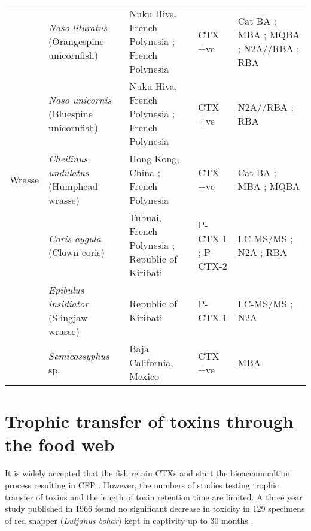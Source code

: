 \documentclass[12pt]{article}
\begin{document}
\begin{longtable}[l]{ | p{2cm} | p{3cm} | p{4.5cm} | p{2cm} | p{3cm} | }
	& \emph{Naso lituratus} (Orangespine unicornfish) & Nuku Hiva, French Polynesia \cite{darius2007ciguatera}; French Polynesia \cite{chinain2014mail,bagnis1987use} & CTX +ve \cite{darius2007ciguatera,bagnis1987use,chinain2014mail} & Cat BA \cite{bagnis1987use}; MBA \cite{bagnis1987use}; MQBA \cite{bagnis1987use}; N2A//RBA \cite{chinain2014mail}; RBA \cite{darius2007ciguatera}\\
	& \emph{Naso unicornis} (Bluespine unicornfish) & Nuku Hiva, French Polynesia \cite{darius2007ciguatera}; French Polynesia \cite{chinain2014mail} & CTX +ve \cite{darius2007ciguatera,chinain2014mail} & N2A//RBA \cite{chinain2014mail}; RBA \cite{darius2007ciguatera} \\
	\hline
	Wrasse & \emph{Cheilinus undulatus} (Humphead wrasse) & Hong Kong, China \cite{wong2005study,wong2009solid}; French Polynesia \cite{bagnis1987use} & CTX +ve \cite{bagnis1987use,wong2005study,wong2009solid} & Cat BA \cite{bagnis1987use}; MBA \cite{bagnis1987use,wong2005study,wong2009solid}; MQBA \cite{bagnis1987use} \\
	& \emph{Coris aygula} (Clown coris) & Tubuai, French Polynesia \cite{darius2007ciguatera}; Republic of Kiribati \cite{mak2013pacific} & P-CTX-1 \cite{mak2013pacific}; P-CTX-2 \cite{mak2013pacific} & LC-MS/MS \cite{mak2013pacific}; N2A \cite{mak2013pacific}; RBA \cite{darius2007ciguatera} \\
	& \emph{Epibulus insidiator} (Slingjaw wrasse) & Republic of Kiribati \cite{mak2013pacific} & P-CTX-1 \cite{mak2013pacific} & LC-MS/MS \cite{mak2013pacific}; N2A \cite{mak2013pacific} \\
	& \emph{Semicossyphus} sp. & Baja California, Mexico \cite{lechuga1995documented} & CTX +ve \cite{lechuga1995documented} & MBA \cite{lechuga1995documented}\\
	\hline
\end{longtable}


\FloatBarrier


\section{Trophic transfer of toxins through the food web}

It is widely accepted that the fish retain CTXs and start the bioaccumualtion process resulting in CFP \cite{randall1958review,yasumoto1977finding}.
However, the numbers of studies testing trophic transfer of toxins and the length of toxin retention time are limited.
A three year study published in 1966 found no significant decrease in toxicity in 129 specimens of red snapper (\emph{Lutjanus bohar}) kept in captivity up to 30 months \cite{banner1966retention}.\\
\end{document}
